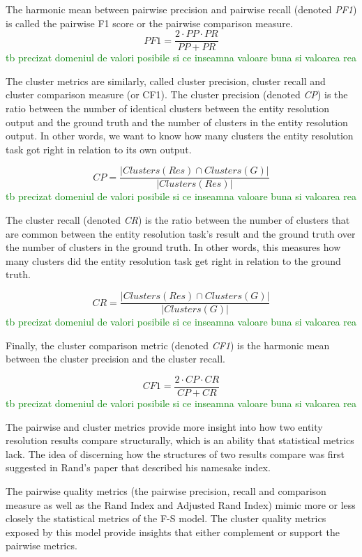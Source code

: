 \documentclass[journal]{IEEEtran}
\begin{document}
    The harmonic mean between pairwise precision and pairwise recall (denoted
    \textit{PF1}) is called the pairwise F1 score or the pairwise comparison
    measure\cite{Men10}.
    \[
        PF1=\frac{2 \cdot PP \cdot PR}{PP + PR}
    \]
    \textcolor{green}{tb precizat domeniul de valori posibile si ce inseamna valoare buna si valoarea rea}

    The cluster metrics are similarly, called cluster precision, cluster recall and
    cluster comparison measure (or CF1).
    The cluster precision (denoted \textit{CP}) is the ratio between the number
    of identical clusters between the entity resolution output and the ground
    truth and the number of clusters in the entity resolution output.
    In other words, we want to know how many clusters the entity resolution task
    got right in relation to its own output.

    \[
        CP=\frac{|Clusters(Res) \cap Clusters(G)|}{|Clusters(Res)|}
    \]
    \textcolor{green}{tb precizat domeniul de valori posibile si ce inseamna valoare buna si valoarea rea}

    The cluster recall (denoted \textit{CR}) is the ratio between the number of
    clusters that are common between the entity resolution task's result and
    the ground truth over the number of clusters in the ground truth.
    In other words, this measures how many clusters did the entity resolution
    task get right in relation to the ground truth.

    \[
        CR = \frac{|Clusters(Res) \cap Clusters(G)|}{|Clusters(G)|}
    \]
    \textcolor{green}{tb precizat domeniul de valori posibile si ce inseamna valoare buna si valoarea rea}

    Finally, the cluster comparison metric (denoted \textit{CF1}) is the
    harmonic mean between the cluster precision and the cluster recall.

    \[
        CF1 = \frac{2 \cdot CP \cdot CR}{CP + CR}
    \]
    \textcolor{green}{tb precizat domeniul de valori posibile si ce inseamna valoare buna si valoarea rea}

    The pairwise and cluster metrics provide more insight into how two entity
    resolution results compare structurally, which is an ability that statistical
    metrics lack.
    The idea of discerning how the structures of two results compare was first
    suggested in Rand's paper that described his namesake index\cite{rand1971}.
    
    The pairwise quality metrics (the pairwise precision, recall and
    comparison measure as well as the Rand Index and Adjusted Rand Index) mimic
    more or less closely the statistical metrics of the F-S model.
    The cluster quality metrics exposed by this model provide insights that
    either complement or support the pairwise metrics.
    
\end{document}
